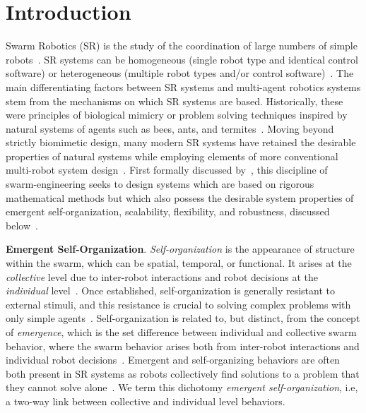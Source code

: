 \chapter{Introduction}\label{chap:intro}

Swarm Robotics (SR) is the study of the coordination of large numbers of simple
robots~\cite{Sahin2005}. SR systems can be homogeneous (single robot type
and identical control software) or heterogeneous (multiple robot types and/or
control software)~\cite{Dorigo2013,Rizk2019,Ramachandran2020}. The main
differentiating factors between SR systems and multi-agent robotics
systems stem from the mechanisms on which SR systems are based.
Historically, these were principles of biological mimicry or problem solving
techniques inspired by natural systems of agents such as bees, ants, and
termites~\cite{Labella2006}. Moving beyond strictly biomimetic design, many
modern SR systems have retained the desirable properties of natural
systems while employing elements of more conventional multi-robot system
design~\cite{Castello2016,Arvin2015,Steyven2018}.  First formally discussed
by~\cite{Winfield2005}, this discipline of \gls{swarm-engineering} seeks to
design systems which are based on rigorous mathematical methods but which also
possess the desirable system properties of emergent self-organization,
scalability, flexibility, and robustness, discussed
below~\cite{Brambilla2013a}.

\textbf{Emergent Self-Organization}. \emph{Self-organization} is the appearance
of structure within the swarm, which can be spatial, temporal, or functional. It
arises at the \emph{collective} level due to inter-robot interactions and robot
decisions at the \emph{individual} level~\cite{Winfield2005a,Galstyan2005}. Once
established, self-organization is generally resistant to external stimuli, and
this resistance is crucial to solving complex problems with only simple
agents~\cite{Hunt2020,DeWolf2005}.  Self-organization is related to, but
distinct, from the concept of \emph{emergence}, which is the set difference
between individual and collective swarm behavior, where the swarm behavior
arises both from inter-robot interactions and individual robot
decisions~\cite{Szabo2014,DeWolf2005}.  Emergent and self-organizing behaviors
are often both present in SR systems as robots collectively find solutions
to a problem that they cannot solve alone~\cite{Cotsaftis2009,Hunt2020}. We term
this dichotomy \emph{emergent self-organization}, i.e, a two-way link between
collective and individual level behaviors.


